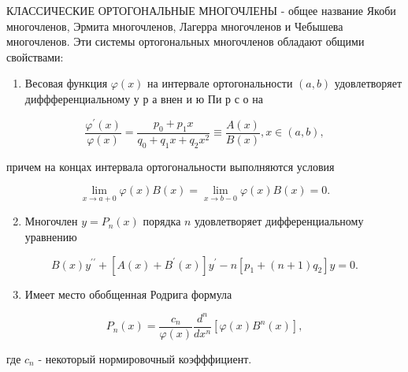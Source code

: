 \documentclass[10pt]{article}
\begin{document}
КЛАССИЧЕСКИЕ ОРТОГОНАЛЬНЫЕ МНОГОЧЛЕНЫ - общее название Якоби многочленов, Эрмита многочленов, Лагерра многочленов и Чебышева многочленов. Эти системы ортогональных многочленов обладают общими свойствами:



\begin{enumerate}

  \item Весовая функция $\varphi(x)$ на интервале ортогональности $(a, b)$ удовлетворяет диффференциальному у р а внен и ю Пи р с о на

\end{enumerate}



\[

\frac{\varphi^{\prime}(x)}{\varphi(x)}=\frac{p_{0}+p_{1} x}{q_{0}+q_{1} x+q_{2} x^{2}} \equiv \frac{A(x)}{B(x)}, x \in(a, b),

\]



причем на концах интервала ортогональности выполняются условия



\[

\lim _{x \rightarrow a+0} \varphi(x) B(x)=\lim _{x \rightarrow b-0} \varphi(x) B(x)=0 .

\]



\begin{enumerate}

  \setcounter{enumi}{1}

  \item Многочлен $y=P_{n}(x)$ порядка $n$ удовлетворяет дифференциальному уравнению

\end{enumerate}



\[

B(x) y^{\prime \prime}+\left[A(x)+B^{\prime}(x)\right] y^{\prime}-n\left[p_{1}+(n+1) q_{2}\right] y=0 .

\]



\begin{enumerate}

  \setcounter{enumi}{2}

  \item Имеет место обобщенная Родрига формула

\end{enumerate}



\[

P_{n}(x)=\frac{c_{n}}{\varphi(x)} \frac{d^{n}}{d x^{n}}\left[\varphi(x) B^{n}(x)\right],

\]



где $c_{n}$ - некоторый нормировочный коэфффициент.
\end{document}
